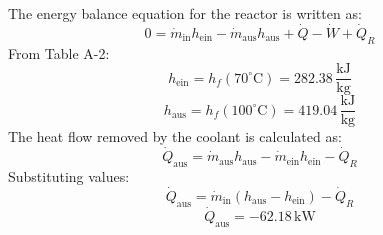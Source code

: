The energy balance equation for the reactor is written as:  
\[
0 = \dot{m}_{\text{in}} h_{\text{ein}} - \dot{m}_{\text{aus}} h_{\text{aus}} + \dot{Q} - \dot{W} + \dot{Q}_R
\]  
From Table A-2:  
\[
h_{\text{ein}} = h_f(70^\circ\text{C}) = 282.38 \, \frac{\text{kJ}}{\text{kg}}
\]  
\[
h_{\text{aus}} = h_f(100^\circ\text{C}) = 419.04 \, \frac{\text{kJ}}{\text{kg}}
\]  
The heat flow removed by the coolant is calculated as:  
\[
\dot{Q}_{\text{aus}} = \dot{m}_{\text{aus}} h_{\text{aus}} - \dot{m}_{\text{ein}} h_{\text{ein}} - \dot{Q}_R
\]  
Substituting values:  
\[
\dot{Q}_{\text{aus}} = \dot{m}_{\text{in}} (h_{\text{aus}} - h_{\text{ein}}) - \dot{Q}_R
\]  
\[
\dot{Q}_{\text{aus}} = -62.18 \, \text{kW}
\]